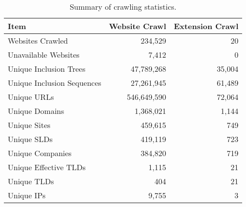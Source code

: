 \begin{table}[t]
    \centering
    \footnotesize
    \begin{tabular}{lrr}
    \toprule
    \textbf{Item} & \textbf{Website Crawl} & \textbf{Extension Crawl} \\
    \midrule
    Websites Crawled & 234,529 & 20 \\
    Unavailable Websites & 7,412 & 0 \\
    \midrule
    Unique Inclusion Trees & 47,789,268 & 35,004 \\
    Unique Inclusion Sequences & 27,261,945 & 61,489 \\
    \midrule
    Unique URLs & 546,649,590 & 72,064 \\
    Unique Domains & 1,368,021 & 1,144 \\
    Unique Sites & 459,615 & 749 \\
    Unique SLDs & 419,119 & 723 \\
    Unique Companies & 384,820 & 719 \\
    Unique Effective TLDs & 1,115 & 21 \\
    Unique TLDs & 404 & 21 \\
    Unique IPs & 9,755 & 3 \\
    \bottomrule
    \end{tabular}
    \caption{Summary of crawling statistics.}
    \label{inclusion:tab:crawling_statistics}
\end{table}
